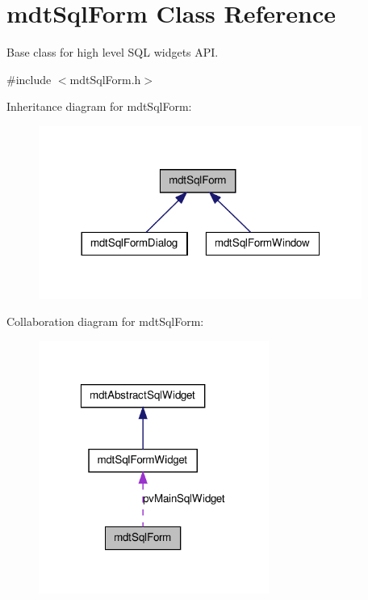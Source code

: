 \hypertarget{classmdt_sql_form}{
\section{mdtSqlForm Class Reference}
\label{classmdt_sql_form}
}


Base class for high level SQL widgets API.  




{\ttfamily \#include $<$mdtSqlForm.h$>$}



Inheritance diagram for mdtSqlForm:
\nopagebreak
\begin{figure}[H]
\begin{center}
\leavevmode
\includegraphics[width=300pt]{classmdt_sql_form__inherit__graph}
\end{center}
\end{figure}


Collaboration diagram for mdtSqlForm:\nopagebreak
\begin{figure}[H]
\begin{center}
\leavevmode
\includegraphics[width=214pt]{classmdt_sql_form__coll__graph}
\end{center}
\end{figure}
